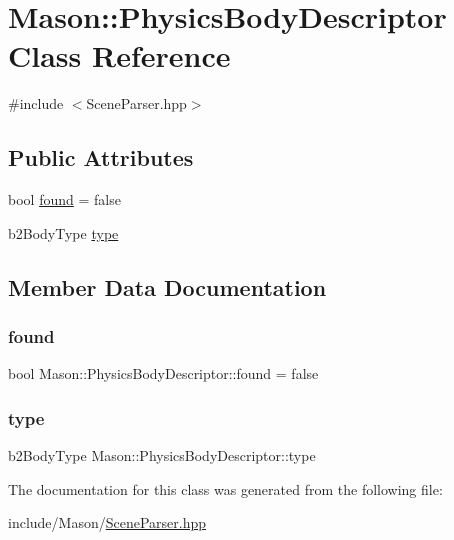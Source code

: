 \hypertarget{class_mason_1_1_physics_body_descriptor}{}\section{Mason\+:\+:Physics\+Body\+Descriptor Class Reference}
\label{class_mason_1_1_physics_body_descriptor}


{\ttfamily \#include $<$Scene\+Parser.\+hpp$>$}

\subsection*{Public Attributes}
\begin{DoxyCompactItemize}
\item 
bool \hyperlink{class_mason_1_1_physics_body_descriptor_aa2f258b6d07e44ce6bf4ccbea346f81d}{found} = false
\item 
b2\+Body\+Type \hyperlink{class_mason_1_1_physics_body_descriptor_a3fff369ef465ec0da8ae5a44957b4832}{type}
\end{DoxyCompactItemize}


\subsection{Member Data Documentation}
\hypertarget{class_mason_1_1_physics_body_descriptor_aa2f258b6d07e44ce6bf4ccbea346f81d}{}\label{class_mason_1_1_physics_body_descriptor_aa2f258b6d07e44ce6bf4ccbea346f81d} 
\subsubsection{\texorpdfstring{found}{found}}
{\footnotesize\ttfamily bool Mason\+::\+Physics\+Body\+Descriptor\+::found = false}

\hypertarget{class_mason_1_1_physics_body_descriptor_a3fff369ef465ec0da8ae5a44957b4832}{}\label{class_mason_1_1_physics_body_descriptor_a3fff369ef465ec0da8ae5a44957b4832} 
\subsubsection{\texorpdfstring{type}{type}}
{\footnotesize\ttfamily b2\+Body\+Type Mason\+::\+Physics\+Body\+Descriptor\+::type}



The documentation for this class was generated from the following file\+:\begin{DoxyCompactItemize}
\item 
include/\+Mason/\hyperlink{_scene_parser_8hpp}{Scene\+Parser.\+hpp}\end{DoxyCompactItemize}
